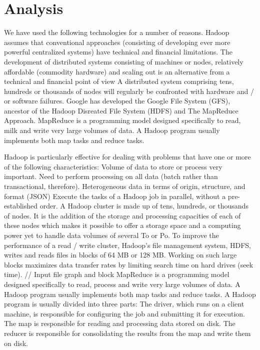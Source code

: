 \documentclass{acmtog} %
\begin{document}
\section{Analysis}
\label{sec:analysis}
We have used the following technologies for a number of reasons. Hadoop assumes that conventional approaches (consisting of developing ever more powerful centralized systems) have technical and financial limitations.
The development of distributed systems consisting of machines or nodes, relatively affordable (commodity hardware) and scaling out is an alternative from a technical and financial point of view
A distributed system comprising tens, hundreds or thousands of nodes will regularly be confronted with hardware and / or software failures.
Google has developed the Google File System (GFS), ancestor of the Hadoop Disreated File System (HDFS) and The MapReduce Approach.
MapReduce is a programming model designed specifically to read, milk and write very large volumes of data. A Hadoop program usually implements both map tasks and reduce tasks.

Hadoop is particularly effective for dealing with problems that have one or more of the following characteristics:
Volume of data to store or process very important.
Need to perform processing on all data (batch rather than transactional, therefore).
Heterogeneous data in terms of origin, structure, and format (JSON)
Execute the tasks of a Hadoop job in parallel, without a pre-established order.
A Hadoop cluster is made up of tens, hundreds, or thousands of nodes. It is the addition of the storage and processing capacities of each of these nodes which makes it possible to offer a storage space and a computing power yet to handle data volumes of several To or Po.
To improve the performance of a read / write cluster, Hadoop's file management system, HDFS, writes and reads files in blocks of 64 MB or 128 MB. Working on such large blocks maximizes data transfer rates by limiting search time on hard drives (seek time).
// Input file graph and block
MapReduce is a programming model designed specifically to read, process and write very large volumes of data. A Hadoop program usually implements both map tasks and reduce tasks.
A Hadoop program is usually divided into three parts:
The driver, which runs on a client machine, is responsible for configuring the job and submitting it for execution.
The map is responsible for reading and processing data stored on disk.
The reducer is responsible for consolidating the results from the map and write them on disk.
\end{document}
